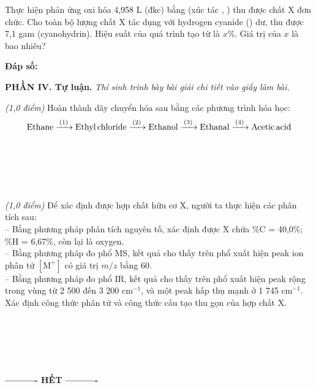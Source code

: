 \documentclass[12pt,a4paper]{article}
\begin{document}
\begin{ex}
Thực hiện phản ứng oxi hóa 4,958 L  (đkc) bằng  (xúc tác , ) thu được chất X đơn chức. Cho toàn bộ lượng chất X tác dụng với hydrogen cyanide () dư, thu được 7,1 gam  (cyanohydrin). Hiệu suất của quá trình tạo  từ  là $x$\%. Giá trị của $x$ là bao nhiêu?

\vspace{0.2cm}
\noindent\textbf{Đáp số:} \dotfill
\end{ex}

\vspace{0.3cm}
\noindent\textbf{\large PHẦN IV. Tự luận.}
\textit{Thí sinh trình bày bài giải chi tiết vào giấy làm bài.}
\vspace{0.2cm}

\begin{ex}
\textit{(1,0 điểm)} Hoàn thành dãy chuyển hóa sau bằng các phương trình hóa học:
$$\ce{Ethane ->[(1)] Ethyl chloride ->[(2)] Ethanol ->[(3)] Ethanal ->[(4)] Acetic acid}$$

\vspace{0.2cm}
\noindent\dotfill\\[4pt]
\noindent\dotfill\\[4pt]
\noindent\dotfill\\[4pt]
\noindent\dotfill\\[4pt]
\noindent\dotfill
\end{ex}

\begin{ex}
\textit{(1,0 điểm)} Để xác định được hợp chất hữu cơ X, người ta thực hiện các phân tích sau:\\
-- Bằng phương pháp phân tích nguyên tố, xác định được X chứa \%C = 40,0\%; \%H = 6,67\%, còn lại là oxygen.\\
-- Bằng phương pháp đo phổ MS, kết quả cho thấy trên phổ xuất hiện peak ion phân tử $[\text{M}^+]$ có giá trị $m/z$ bằng 60.\\
-- Bằng phương pháp đo phổ IR, kết quả cho thấy trên phổ xuất hiện peak rộng trong vùng từ 2 500 đến 3 200 cm$^{-1}$, và một peak hấp thụ mạnh ở 1 745 cm$^{-1}$.\\
Xác định công thức phân tử và công thức cấu tạo thu gọn của hợp chất X.

\vspace{0.2cm}
\noindent\dotfill\\[4pt]
\noindent\dotfill\\[4pt]
\noindent\dotfill\\[4pt]
\noindent\dotfill\\[4pt]
\noindent\dotfill
\end{ex}

\bigskip
\begin{center}
\textbf{---------- HẾT ----------}
\end{center}
\end{document}
